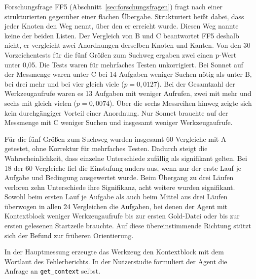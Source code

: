\begin{ungelesen}
{Forschungsfrage FF5 (Abschnitt~\ref{sec:forschungsfragen}) fragt nach einer strukturierten gegenüber einer flachen Übergabe. Strukturiert heißt dabei, dass jeder Knoten den Weg nennt, über den er erreicht wurde. Diesen Weg nannte keine der beiden Listen. Der Vergleich von B und C beantwortet FF5 deshalb nicht, er vergleicht zwei Anordnungen derselben Knoten und Kanten. Von den 30 Vorzeichentests für die fünf Größen zum Suchweg ergaben zwei einen p-Wert unter 0,05. Die Tests waren für mehrfaches Testen unkorrigiert. Bei Sonnet auf der Messmenge waren unter C bei 14 Aufgaben weniger Suchen nötig als unter B, bei drei mehr und bei vier gleich viele ($p = 0{,}0127$). Bei der Gesamtzahl der Werkzeugaufrufe waren es 13 Aufgaben mit weniger Aufrufen, zwei mit mehr und sechs mit gleich vielen ($p = 0{,}0074$). Über die sechs Messreihen hinweg zeigte sich kein durchgängiger Vorteil einer Anordnung. Nur Sonnet brauchte auf der Messmenge mit C weniger Suchen und insgesamt weniger Werkzeugaufrufe.

Für die fünf Größen zum Suchweg wurden insgesamt 60 Vergleiche mit A getestet, ohne Korrektur für mehrfaches Testen. Dadurch steigt die Wahrscheinlichkeit, dass einzelne Unterschiede zufällig als signifikant gelten. Bei 18 der 60 Vergleiche fiel die Einstufung anders aus, wenn nur der erste Lauf je Aufgabe und Bedingung ausgewertet wurde. Beim Übergang zu drei Läufen verloren zehn Unterschiede ihre Signifikanz, acht weitere wurden signifikant. Sowohl beim ersten Lauf je Aufgabe als auch beim Mittel aus drei Läufen überwogen in allen 24 Vergleichen die Aufgaben, bei denen der Agent mit Kontextblock weniger Werkzeugaufrufe bis zur ersten Gold-Datei oder bis zur ersten gelesenen Startzeile brauchte. Auf diese übereinstimmende Richtung stützt sich der Befund zur früheren Orientierung.

In der Hauptmessung erzeugte das Werkzeug den Kontextblock mit dem Wortlaut des Fehlerberichts. In der Nutzerstudie formuliert der Agent die Anfrage an \texttt{get\_context} selbst.

}
\end{ungelesen}
